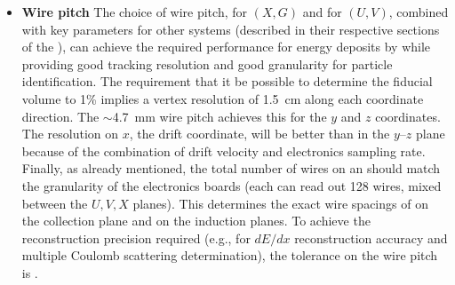 \begin{itemize}
\item \textbf{Wire pitch} The choice of wire pitch, \xgpitch for $(X,G)$ and \uvpitch for $(U,V)$, combined with key parameters for other  systems (described in their respective sections of the ), can achieve the required performance for energy deposits by  while providing good tracking resolution and good granularity for particle identification. The \single requirement that it be possible to determine the fiducial volume to \num{1}\% implies a vertex resolution of \SI{1.5}{cm} along each coordinate direction. The $\sim$\SI{4.7}{mm} %
wire pitch achieves this for the $y$ and $z$ coordinates.  The resolution on $x$, the drift coordinate, will be better than in the $y$--$z$ plane because of the combination of drift velocity and electronics sampling rate.  Finally, as already mentioned, the total number of wires on an  should match the granularity of the electronics boards (each  can read out \num{128} wires, mixed between the $U,V,X$ planes). This determines the exact wire spacings of \xgpitch on the collection plane and \uvpitch on the induction planes.  To achieve the reconstruction precision required (e.g., for $dE/dx$ reconstruction accuracy and multiple Coulomb scattering determination), the tolerance on the wire pitch is \wirepitchtol.


\end{itemize}
